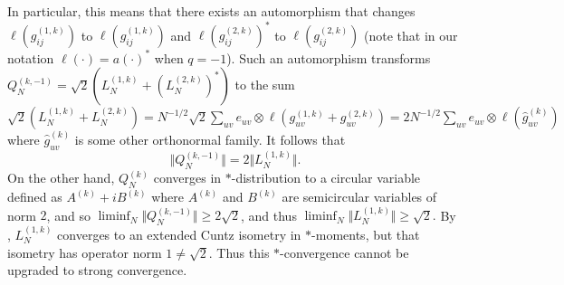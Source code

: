 \documentclass[11pt]{article}
\begin{document}
In particular, this means that there exists an automorphism that changes $\ell (g_{ij}^{(1,k)})$ to $\ell(g_{ij}^{(1,k)})$ and $\ell(g_{ij}^{(2,k)})^*$ to $\ell(g_{ij}^{(2,k)})$ (note that in our notation $\ell(\cdot)=a(\cdot)^*$ when $q=-1$).  Such an automorphism transforms $Q_N^{(k,-1)} = \sqrt{2}(L_N^{(1,k)} + (L_N^{(2,k)})^*)$ to the sum $\sqrt{2}(L_N^{(1,k)} + L_N^{(2,k)}) = N^{-1/2}\sqrt{2} \sum_{uv} e_{uv}\otimes \ell( g_{uv}^{(1,k)} + g_{uv}^{(2,k)}) = {2}  N^{-1/2} \sum_{uv} e_{uv} \otimes \ell(\hat{g}_{uv}^{(k)})$ where $\hat{g}_{uv}^{(k)}$ is some other orthonormal family.  It follows that 
$$\Vert Q_N^{(k,-1)}\Vert = {2} \Vert L_{N}^{(1,k)} \Vert.$$  
On the other hand, $Q_N^{(k)}$ converges in $*$-distribution to a circular variable defined as $A^{(k)} + i B^{(k)}$ where $A^{(k)}$ and $B^{(k)}$ are semicircular variables of norm $2$, and so $\liminf_N \Vert Q_N^{(k,-1)}\Vert \geq 2\sqrt{2}$, and thus $\liminf_N \Vert L_N^{(1,k)}\Vert \geq \sqrt{2}.$  By \cite{Shlyakhtenko:Matrices}, $L_N^{(1,k)}$ converges to an extended Cuntz isometry in $*$-moments, but that isometry has operator norm $1 \neq \sqrt{2}$. Thus this $*$-convergence cannot be upgraded to strong convergence. 
\end{document}
